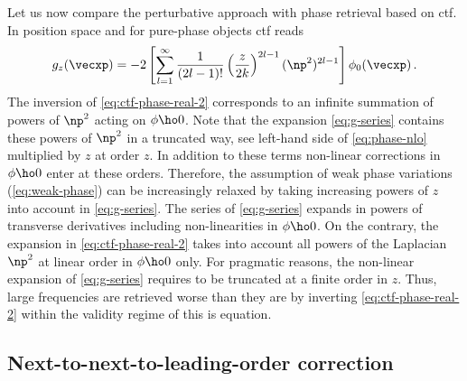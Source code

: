 \documentclass[
twoside,
openright,
titlepage,
numbers=noenddot,
headinclude,
fleqn,
a4paper,
footinclude=true,
cleardoublepage=empty,
abstractoff,
BCOR=5mm,
paper=a4,
fontsize=11pt,
british,ngerman,american,
]{scrreprt}
\begin{document}
Let us now compare the perturbative approach with phase retrieval
based on \ac{ctf}.  In position space and for  pure-phase objects
\ac{ctf} reads
\begin{equation}
  \label{eq:ctf-phase-real-2}
  g_{z}(\vecxp) = 
  -2\left[\sum^\infty_{l=1}\frac{1}{(2 l-1)!}
    \left(\frac{z}{2k}\right)^{2 l-1}
    (\np^2)^{2 l-1}\right]\phi_0(\vecxp) \,.
\end{equation}
The inversion of \cref{eq:ctf-phase-real-2} corresponds to an infinite
summation of powers of $\np^2$ acting on $\phi\ho0$.  Note that the
expansion \cref{eq:g-series} contains these powers of $\np^2$ in a
truncated way, see left-hand side of \cref{eq:phase-nlo} multiplied by
$z$ at order $z$.
In addition to these terms non-linear corrections in $\phi\ho0$ enter
at these orders.  Therefore, the assumption of weak phase variations
(\cref{eq:weak-phase}) can be increasingly relaxed by taking
increasing powers of $z$ into account in \cref{eq:g-series}.  The
series of \cref{eq:g-series} expands in powers of transverse
derivatives including non-linearities in $\phi\ho0$.  On the contrary,
the expansion in \cref{eq:ctf-phase-real-2} takes into account all
powers of the Laplacian $\np^2$ at linear order in $\phi\ho0$ only.
For pragmatic reasons, the non-linear expansion of \cref{eq:g-series}
requires to be truncated at a finite order in $z$.  Thus, large
frequencies are retrieved worse than they are by inverting
\cref{eq:ctf-phase-real-2} within the validity regime of this is
equation.


\subsection{Next-to-next-to-leading-order correction}
\label{sec:nnlo}

\end{document}
